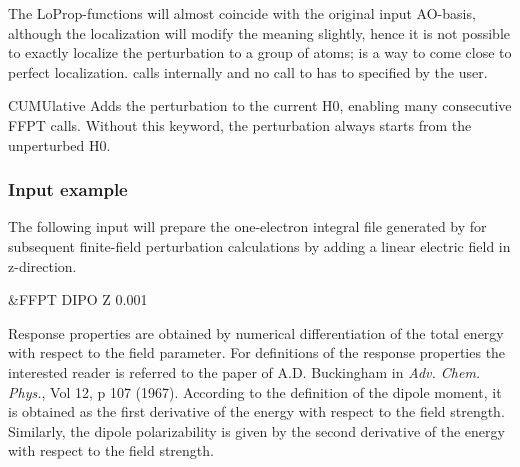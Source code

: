 \begin{keywordlist}
The LoProp-functions will almost coincide with the
original input AO-basis, although the localization will modify the meaning
slightly, hence it is not possible to exactly localize the perturbation to
a group of atoms;  is a way to come close to perfect
localization.  calls  internally and no call to
 has to specified by the user.
\item[CUMUlative]
Adds the perturbation to the current H0, enabling many consecutive
FFPT calls. Without this keyword, the perturbation always starts from
the unperturbed H0.
\end{keywordlist}

\subsubsection{Input example}

The following input will prepare the one-{}electron integral file generated by
 for subsequent finite-{}field perturbation calculations by adding
a linear electric field in z-direction.
\begin{inputlisting}
 &FFPT
DIPO
Z 0.001
\end{inputlisting}
Response properties are obtained by numerical differentiation of the total energy
with respect to the field parameter. For definitions of the response properties
the interested reader is referred to the paper of A.D. Buckingham in {\em Adv.
Chem. Phys.}, Vol 12, p 107 (1967). According to the definition of the dipole
moment, it is obtained as the first derivative of the energy with
respect to the field strength. Similarly, the dipole polarizability is given
by the second derivative of the energy with respect to the field strength.

